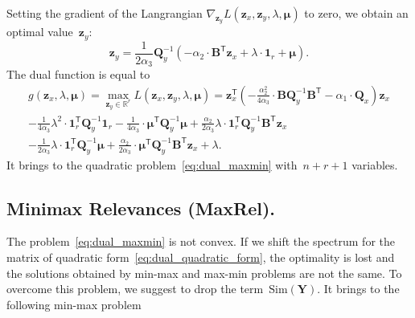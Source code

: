 \documentclass[12pt,oneside]{article}
\theoremstyle{definition}
\newcommand{\bz}{\mathbf{z}}
\newcommand{\bY}{\mathbf{Y}}
\newcommand{\bB}{\mathbf{B}}
\newcommand{\bQ}{\mathbf{Q}}
\newcommand{\bbR}{\mathbb{R}}
\newcommand{\T}{\mathsf{T}}
\newcommand{\bmu}{\boldsymbol{\mu}}
\newcommand{\bOne}{\boldsymbol{1}}
\begin{document}
Setting the gradient of the Langrangian $\nabla_{\bz_y} L(\bz_x, \bz_y, \lambda, \bmu)$ to zero, we obtain an optimal value~$\bz_y$:
\begin{equation}
	\bz_y = \frac{1}{2\alpha_3} \bQ_y^{-1} \left( - \alpha_2 \cdot \bB^{\T} \bz_x +\lambda \cdot \bOne_r + \bmu \right).
	\label{eq:ax}
\end{equation}
The dual function is equal to
\begin{multline}
	g(\bz_x, \lambda, \bmu)
	= \max_{\bz_y \in \bbR^r} L(\bz_x, \bz_y, \lambda, \bmu) =
	\bz_x^{\T} \left( - \frac{\alpha_2^2}{4\alpha_3} \cdot \bB \bQ_y^{-1} \bB^{\T} - \alpha_1 \cdot \bQ_x\right) \bz_x \\ - \frac{1}{4 \alpha_3} \lambda^2 \cdot \bOne_r^{\T} \bQ_y^{-1} \bOne_r - \frac{1}{4 \alpha_3} \cdot \bmu^{\T} \bQ_y^{-1} \bmu + \frac{\alpha_2}{2 \alpha_3} \lambda \cdot \bOne_r^{\T} \bQ_y^{-1} \bB^{\T} \bz_x \\ - \frac{1}{2 \alpha_3} \lambda \cdot \bOne_r^{\T} \bQ_y^{-1} \bmu + \frac{\alpha_2}{2 \alpha_3} \cdot \bmu^{\T} \bQ_y^{-1} \bB^{\T} \bz_x + \lambda.
	 \label{eq:dual_quadratic_form}
\end{multline}
It brings to the quadratic problem~\eqref{eq:dual_maxmin} with~$n + r + 1$ variables.

\subsection{Minimax Relevances (MaxRel).}

The problem~\eqref{eq:dual_maxmin} is not convex. If we shift the spectrum for the matrix of quadratic form~\eqref{eq:dual_quadratic_form}, the optimality is lost and the solutions obtained by min-max and max-min problems are not the same. To overcome this problem, we suggest to drop the term~$\text{Sim}(\bY)$. It brings to the following min-max problem
\end{document}
